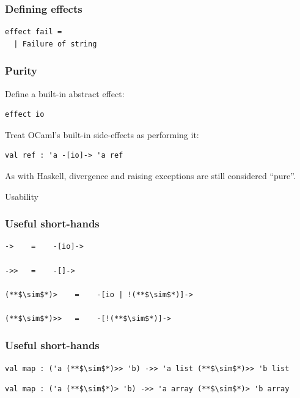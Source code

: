 \documentclass{beamer}
\begin{document}
\begin{frame}[fragile]
\frametitle{Defining effects}
\begin{lstlisting}[style=ocaml]
effect fail =
  | Failure of string
\end{lstlisting}
\end{frame}

\begin{frame}[fragile]
\frametitle{Purity}
Define a built-in abstract effect:
\begin{lstlisting}[style=ocaml]
effect io
\end{lstlisting}
Treat OCaml's built-in side-effects as performing it:
\begin{lstlisting}[style=ocaml]
val ref : 'a -[io]-> 'a ref
\end{lstlisting}
As with Haskell, divergence and raising exceptions are still considered
``pure''.
\end{frame}

\begin{frame}[c]
\begin{center}
\Huge Usability
\end{center}
\end{frame}

\begin{frame}[fragile]
\frametitle{Useful short-hands}
\begin{lstlisting}[style=ocaml]
->    =    -[io]->

->>   =    -[]->

(**$\sim$*)>    =    -[io | !(**$\sim$*)]->

(**$\sim$*)>>   =    -[!(**$\sim$*)]->
\end{lstlisting}
\end{frame}

\begin{frame}[fragile]
\frametitle{Useful short-hands}
\begin{lstlisting}[style=ocaml]
val map : ('a (**$\sim$*)>> 'b) ->> 'a list (**$\sim$*)>> 'b list
\end{lstlisting}
\begin{lstlisting}[style=ocaml]
val map : ('a (**$\sim$*)> 'b) ->> 'a array (**$\sim$*)> 'b array
\end{lstlisting}
\end{frame}
\end{document}
